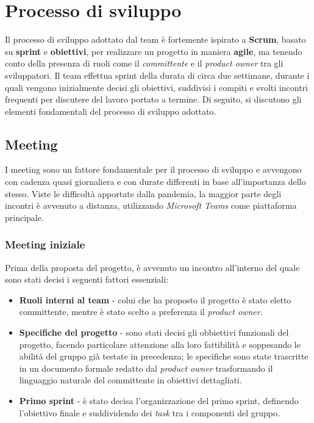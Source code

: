\section{Processo di sviluppo}
Il processo di sviluppo adottato dal team è fortemente ispirato a \textbf{Scrum},
basato su \textbf{sprint} e \textbf{obiettivi}, per realizzare un progetto in maniera \textbf{agile},
ma tenendo conto della presenza di ruoli come il \textit{committente} e il \textit{product owner} tra gli sviluppatori.
Il team effettua sprint della durata di circa due settimane, durante i quali vengono inizialmente decisi gli obiettivi,
suddivisi i compiti e svolti incontri frequenti per discutere del lavoro portato a termine.
Di seguito, si discutono gli elementi fondamentali del processo di sviluppo adottato.

\subsection{Meeting}
I meeting sono un fattore fondamentale per il processo di sviluppo e avvengono con cadenza quasi giornaliera e con durate differenti in base all'importanza dello stesso. Viste le difficoltà apportate dalla pandemia, la maggior parte degli incontri è avvenuto a distanza, utilizzando \textit{Microsoft Teams} come piattaforma principale.

\subsubsection{Meeting iniziale}
Prima della proposta del progetto, è avvenuto un incontro all'interno del quale sono stati decisi i seguenti fattori essenziali:
\begin{itemize}
    \item \textbf{Ruoli interni al team} - colui che ha proposto il progetto è stato eletto committente, mentre è stato scelto a preferenza il \textit{product owner}.
    \item \textbf{Specifiche del progetto} - sono stati decisi gli obbiettivi funzionali del progetto, facendo particolare attenzione alla loro fattibilità e soppesando le abilità del gruppo già testate in precedenza; le specifiche sono state trascritte in un documento formale redatto dal \textit{product owner} trasformando il linguaggio naturale del committente in obiettivi dettagliati.
    \item \textbf{Primo sprint} - è stato decisa l'organizzazione del primo sprint, definendo l'obiettivo finale e suddividendo dei \textit{task} tra i componenti del gruppo.
\end{itemize}

